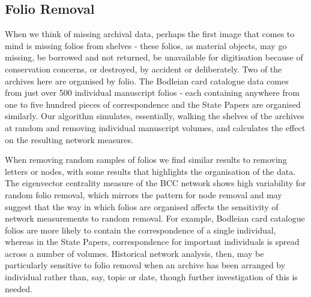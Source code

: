 \documentclass[]{article}
\begin{document}
\hypertarget{folio-removal}{%
\subsection{Folio Removal}\label{folio-removal}}

When we think of missing archival data, perhaps the first image that comes to mind is missing folios from shelves - these folios, as material objects, may go missing, be borrowed and not returned, be unavailable for digitisation because of conservation concerns, or destroyed, by accident or deliberately. Two of the archives here are organised by folio. The Bodleian card catalogue data comes from just over 500 individual manuscript folios - each containing anywhere from one to five hundred pieces of correspondence and the State Papers are organised similarly. Our algorithm simulates, essentially, walking the shelves of the archives at random and removing individual manuscript volumes, and calculates the effect on the resulting network measures.

When removing random samples of folios we find similar results to removing letters or nodes, with some results that highlights the organisation of the data. The eigenvector centrality measure of the BCC network shows high variability for random folio removal, which mirrors the pattern for node removal and may suggest that the way in which folios are organised affects the sensitivity of network measurements to random removal. For example, Bodleian card catalogue folios are more likely to contain the correspondence of a single individual, whereas in the State Papers, correspondence for important individuals is spread across a number of volumes. Historical network analysis, then, may be particularly sensitive to folio removal when an archive has been arranged by individual rather than, say, topic or date, though further investigation of this is needed.
\end{document}
